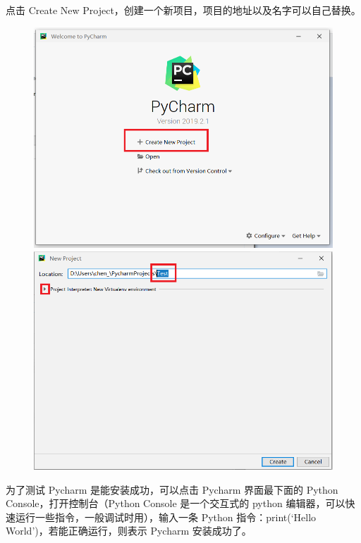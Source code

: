 点击 Create New Project，创建一个新项目，项目的地址以及名字可以自己替换。

\begin{figure}[!ht]
  \centering
  \includegraphics[scale=0.4]{figure/chapter1/pycharm13.png}\quad
  \includegraphics[scale=0.4]{figure/chapter1/pycharm14.png}
\end{figure}

%
%


为了测试 Pycharm 是能安装成功，可以点击 Pycharm 界面最下面的 Python Console，打开控制台（Python Console 是一个交互式的 python 编辑器，可以快速运行一些指令，一般调试时用），输入一条 Python 指令：print(`Hello World')，若能正确运行，则表示 Pycharm 安装成功了。

